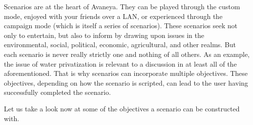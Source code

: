 

Scenarios are at the heart of Avaneya. They can be played through the custom mode, enjoyed with your friends over a LAN, or experienced through the campaign mode (which is itself a series of scenarios). These scenarios seek not only to entertain, but also to inform by drawing upon issues in the environmental, social, political, economic, agricultural, and other realms. But each scenario is never really strictly one and nothing of all others. As an example, the issue of water privatization is relevant to a discussion in at least all of the aforementioned. That is why scenarios can incorporate multiple objectives. These objectives, depending on how the scenario is scripted, can lead to the user having successfully completed the scenario.

Let us take a look now at some of the objectives a scenario can be constructed with.



